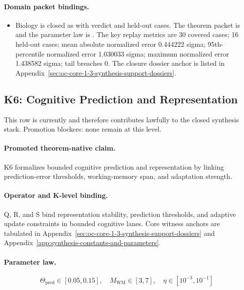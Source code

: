 \paragraph{Domain packet bindings.}
\begin{itemize}[leftmargin=1.6em,nosep]
\item Biology is closed as  with verdict  and  held-out cases. The theorem packet is  and the parameter law is . The key replay metrics are 30 covered cases; 16 held-out cases; mean absolute normalized error 0.444222 sigma; 95th-percentile normalized error 1.030033 sigma; maximum normalized error 1.438582 sigma; tail breaches 0. The closure dossier anchor is listed in Appendix~\ref{sec:oc-core-1-3-synthesis-support-dossiers}.
\end{itemize}

\subsection{K6: Cognitive Prediction and Representation}
\label{sec:oc-core-1-3-synthesis-k6}
This row is currently  and therefore contributes lawfully to the closed synthesis stack.
Promotion blockers: none remain at this level.

\paragraph{Promoted theorem-native claim.}
K6 formalizes bounded cognitive prediction and representation by linking prediction-error thresholds, working-memory span, and adaptation strength.

\paragraph{Operator and K-level binding.}
Q, R, and S bind representation stability, prediction thresholds, and adaptive update constraints in bounded cognitive lanes.
Core witness anchors are tabulated in Appendix~\ref{sec:oc-core-1-3-synthesis-support-dossiers} and Appendix~\ref{app:synthesis-constants-and-parameters}.

\paragraph{Parameter law.}
\[
\Theta_{\mathrm{pred}} \in [0.05,0.15],\quad M_{\mathrm{WM}} \in [3,7],\quad \eta \in [10^{-3},10^{-1}]
\]

